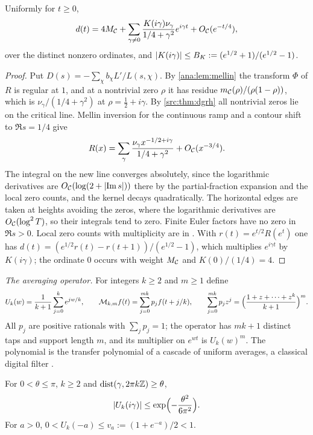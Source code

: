 \begin{lemma}\label{ana:lem:gridexp}
Uniformly for $t\ge0$,
\begin{equation}\label{ana:eq:gridexp}
 d(t)=4M_{\mathcal{C}}+\sum_{\gamma\ne0}\frac{K(i\gamma)\nu_\gamma}{1/4+\gamma^2}e^{i\gamma t}
 +O_{\mathcal{C}}(e^{-t/4}),
\end{equation}
over the distinct nonzero ordinates, and $\lvert K(i\gamma)\rvert\le B_K:=(e^{1/2}+1)/(e^{1/2}-1)$.
\end{lemma}

\begin{proof}
Put $D(s)=-\sum_\chi b_\chi L'/L(s,\chi)$. By \cref{ana:lem:mellin} the transform $\Phi$ of $R$ is
regular at $1$, and at a nontrivial zero $\rho$ it has residue $m_{\mathcal{C}}(\rho)/(\rho(1-\rho))$,
which is $\nu_\gamma/(1/4+\gamma^2)$ at $\rho=\frac12+i\gamma$. By \cref{src:thm:dgrh} all
nontrivial zeros lie on the critical line. Mellin inversion for the continuous ramp and a
contour shift to $\Re s=1/4$ give
\[
 R(x)=\sum_\gamma\frac{\nu_\gamma x^{-1/2+i\gamma}}{1/4+\gamma^2}+O_{\mathcal{C}}(x^{-3/4}).
\]
The integral on the new line converges absolutely, since the logarithmic derivatives are
$O_{\mathcal{C}}(\log(2+\lvert\operatorname{Im} s\rvert))$ there by the partial-fraction expansion and the local zero counts,
and the kernel decays quadratically. The horizontal edges are taken at heights avoiding the
zeros, where the logarithmic derivatives are $O_{\mathcal{C}}(\log^2T)$, so their integrals tend to zero.
Finite Euler factors have no zero in $\Re s>0$. Local zero counts with multiplicity are in
\cite{BennettMartinOBryantRechnitzer2021Counting}. With $r(t)=e^{t/2}R(e^t)$ one has
$d(t)=(e^{1/2}r(t)-r(t+1))/(e^{1/2}-1)$, which multiplies $e^{i\gamma t}$ by $K(i\gamma)$; the
ordinate $0$ occurs with weight $M_{\mathcal{C}}$ and $K(0)/(1/4)=4$.
\end{proof}

\emph{The averaging operator.} For integers $k\ge2$ and $m\ge1$ define
\[
 U_k(w)=\frac1{k+1}\sum_{j=0}^ke^{jw/k},\qquad
 \mathcal{M}_{k,m}f(t)=\sum_{j=0}^{mk}p_jf(t+j/k),\qquad
 \sum_{j=0}^{mk}p_jz^j=\Bigl(\frac{1+z+\dots+z^k}{k+1}\Bigr)^m .
\]
All $p_j$ are positive rationals with $\sum_jp_j=1$; the operator has $mk+1$ distinct taps and
support length $m$, and its multiplier on $e^{wt}$ is $U_k(w)^m$. The polynomial is the
transfer polynomial of a cascade of uniform averages, a classical digital filter
\cite{Hogenauer1981Economical}.

\begin{lemma}\label{ana:lem:contraction}
For $0<\theta\le\pi$, $k\ge2$ and $\operatorname{dist}(\gamma,2\pi k\mathbb{Z})\ge\theta$,
\[
 \lvert U_k(i\gamma)\rvert\le\exp\Bigl(-\frac{\theta^2}{6\pi^2}\Bigr).
\]
For $a>0$, $0<U_k(-a)\le v_a:=(1+e^{-a})/2<1$.
\end{lemma}

